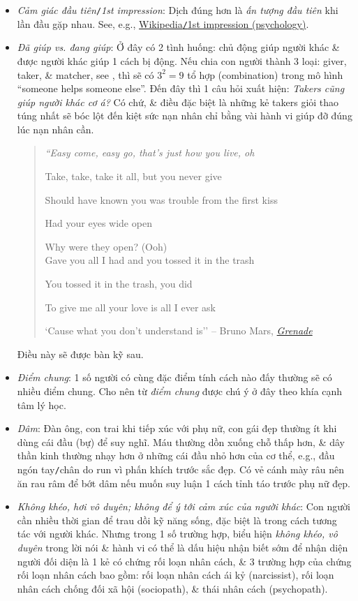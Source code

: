 \documentclass[12pt,oneside]{book}
\begin{document}
\begin{itemize}
	\item {\it Cảm giác đầu tiên}{\tt/}{\it 1st impression}: Dịch đúng hơn là {\it ấn tượng đầu tiên} khi lần đầu gặp nhau. See, e.g., \href{https://en.wikipedia.org/wiki/First_impression_(psychology)}{Wikipedia{\tt/}1st impression (psychology)}.
	\item {\it Đã giúp {\tt <người nào đó>} vs. {\tt <người nào đó>} đang giúp}: Ở đây có 2 tình huống: chủ động giúp người khác \& được người khác giúp 1 cách bị động. Nếu chia con người thành 3 loại: giver, taker, \& matcher, see \cite{Grant_give_take,Grant_give_take_VN}, thì sẽ có $3^2 = 9$ tổ hợp (combination) trong mô hình ``someone helps someone else''. Đến đây thì 1 câu hỏi xuất hiện: {\it Takers cũng giúp người khác cơ á?} Có chứ, \& điều đặc biệt là những kẻ takers giỏi thao túng nhất sẽ bóc lột đến kiệt sức nạn nhân chỉ bằng vài hành vi giúp đỡ đúng lúc nạn nhân cần.
	\begin{quote}\it
		``Easy come, easy go, that's just how you live, oh
		
		Take, take, take it all, but you never give
		
		Should have known you was trouble from the first kiss
		
		Had your eyes wide open
		
		Why were they open? (Ooh)\\
		
		Gave you all I had and you tossed it in the trash
		
		You tossed it in the trash, you did
		
		To give me all your love is all I ever ask
		
		`Cause what you don't understand is'' -- {\sc Bruno Mars}, \href{https://www.youtube.com/watch?v=SR6iYWJxHqs}{{\it Grenade}}
	\end{quote}
	Điều này sẽ được bàn kỹ sau.
	\item {\it Điểm chung}: 1 số người có cùng đặc điểm tính cách nào đấy thường sẽ có nhiều điểm chung. Cho nên từ {\it điểm chung} được chú ý ở đây theo khía cạnh tâm lý học.
	\item {\it Dâm}: Đàn ông, con trai khi tiếp xúc với phụ nữ, con gái đẹp thường ít khi dùng cái đầu (bự) để suy nghĩ. Máu thường dồn xuống chỗ thấp hơn, \& dây thần kinh thường nhạy hơn ở những cái đầu nhỏ hơn của cơ thể, e.g., đầu ngón tay{\tt/}chân do run vì phấn khích trước sắc đẹp. Có vẻ cánh mày râu nên ăn rau râm để bớt dâm nếu muốn suy luận 1 cách tỉnh táo trước phụ nữ đẹp.
	\item {\it Không khéo, hơi vô duyên; không để ý tới cảm xúc của người khác}: Con người cần nhiều thời gian để trau dồi kỹ năng sống, đặc biệt là trong cách tương tác với người khác. Nhưng trong 1 số trường hợp, biểu hiện {\it không khéo, vô duyên} trong lời nói \& hành vi có thể là dấu hiệu nhận biết sớm để nhận diện người đối diện là 1 kẻ có chứng rối loạn nhân cách, \& 3 trường hợp của chứng rối loạn nhân cách bao gồm: rối loạn nhân cách ái kỷ (narcissist), rối loạn nhân cách chống đối xã hội (sociopath), \& thái nhân cách (psychopath).
\end{itemize} 
\end{document}
